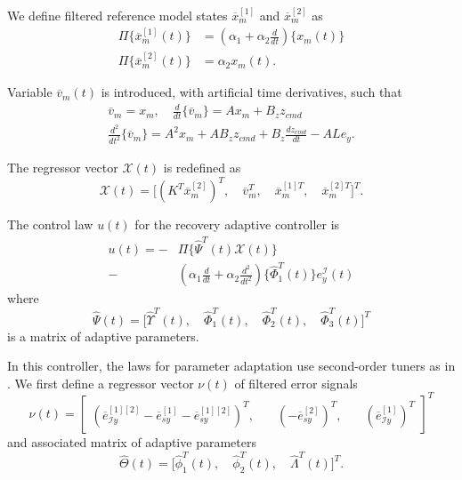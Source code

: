 We define filtered reference model states $\overline{x}_m^{[1]}$ and $\overline{x}_m^{[2]}$ as
\begin{equation}
\begin{aligned}
	\Pi \big \{  \overline{x}_{m}^{[1]} (t) \big \} &= (\alpha_1 + \alpha_2 \frac{d}{dt}) \big \{ x_m (t) \big \} \\
	\Pi \big \{  \overline{x}_{m}^{[2]}(t) \big \} &= \alpha_2 x_m (t).
\end{aligned}	
\end{equation}

Variable $\overline{v}_m(t)$ is introduced, with artificial time derivatives, such that
\begin{equation}
\begin{gathered}
	\overline{v}_m = x_m, \quad \frac{d }{dt}\{ \overline{v}_m \} = A x_m + B_z z_{cmd} \\
	\frac{d^2}{dt^2} \{ \overline{v}_m \} = A^2 x_m + A B_z z_{cmd} + B_z \frac{dz_{cmd}}{dt} - A L e_y.
\end{gathered}
\end{equation}

The regressor vector $\mathcal{X}(t)$ is redefined as
\begin{equation}
\mathcal{X}(t) = \big[ (K^T \overline{x}_m^{[2]})^T,\quad \overline{v}_m^T,\quad \overline{x}_m^{[1]T},\quad \overline{x}_m^{[2]T} \big]^T.
\end{equation}

The control law $u(t)$ for the recovery adaptive controller is
\begin{equation}
\begin{aligned}
	u (t) = -&\Pi \big \{ \hat{\Psi}^T(t) \mathcal{X}(t) \big \} \\ - & (\alpha_1 \frac{d}{dt} + \alpha_2 \frac{d^2}{dt^2}) \big \{ \hat{\Phi}_1^T(t) \big \} e_y^\mathcal{I} (t) 
\end{aligned} \label{eq:u_rd3}
\end{equation}
where 
\begin{equation}
\hat{\Psi}(t) = \big[ \hat{\Upsilon}^T(t),\quad \hat{\Phi}_1^T(t),\quad \hat{\Phi}_2^T(t),\quad \hat{\Phi}_3^T(t) \big]^T 
\end{equation}
is a matrix of adaptive parameters. 

In this controller, the laws for parameter adaptation use second-order tuners as in \cite{qu2016phd}. We first define a regressor vector $\nu(t)$ of filtered error signals
\begin{equation}
	\nu(t) = \begin{bmatrix}
		(\overline{e}_{\mathcal{I}y}^{[1][2]} - \overline{e}_{sy}^{[1]} - \overline{e}_{sy}^{[1][2]})^T, & \quad (-\overline{e}_{sy}^{[2]})^T, & \quad (\overline{e}_{\mathcal{I}y}^{[1]})^T
	\end{bmatrix}^T
\end{equation}
and associated matrix of adaptive parameters
\begin{equation}
\hat{\Theta}(t) = \big[ \hat{\phi}_1^T(t),\quad \hat{\phi}_2^T(t),\quad \hat{\Lambda}^T(t) \big]^T.
\end{equation}

